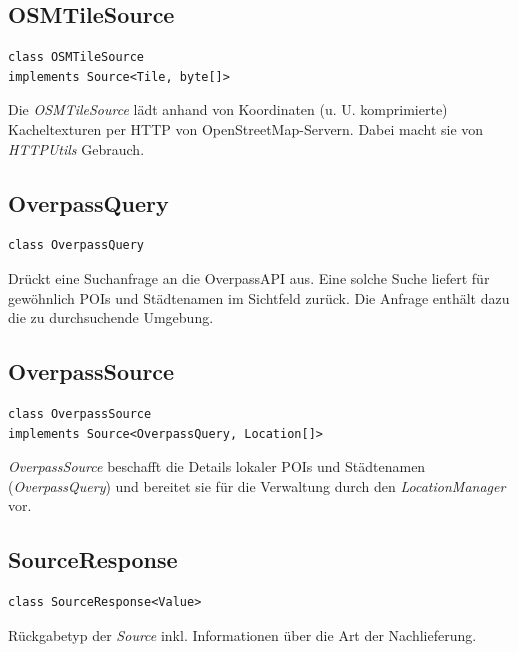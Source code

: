 \documentclass[10pt]{scrreprt}
\begin{document}
\vspace{5mm}
\subsection*{OSMTileSource}
\begin{lstlisting}
class OSMTileSource
implements Source<Tile, byte[]>
\end{lstlisting}
Die \textit{OSMTileSource} lädt anhand von Koordinaten (u. U. komprimierte) Kacheltexturen per HTTP von OpenStreetMap-Servern. Dabei macht sie von \textit{HTTPUtils} Gebrauch.\\

\vspace{5mm}
\subsection*{OverpassQuery}
\begin{lstlisting}
class OverpassQuery
\end{lstlisting}
Drückt eine Suchanfrage an die OverpassAPI aus. Eine solche Suche liefert für gewöhnlich POIs und Städtenamen im Sichtfeld zurück. Die Anfrage enthält dazu die zu durchsuchende Umgebung.\\

\vspace{5mm}
\subsection*{OverpassSource}
\begin{lstlisting}
class OverpassSource
implements Source<OverpassQuery, Location[]>
\end{lstlisting}
\textit{OverpassSource} beschafft die Details lokaler POIs und Städtenamen (\textit{OverpassQuery}) und bereitet sie für die Verwaltung durch den \textit{LocationManager} vor.\\

\vspace{5mm}
\subsection*{SourceResponse}
\begin{lstlisting}
class SourceResponse<Value>
\end{lstlisting}
Rückgabetyp der \textit{Source} inkl. Informationen über die Art der Nachlieferung.\\

\vspace{5mm}
\end{document}

